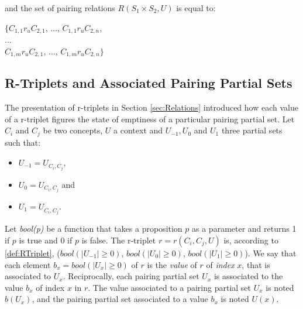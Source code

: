 and the set of pairing relations $R(S_{1} \times S_{2}, U)$ is equal to:

\begin{center}
    $\{ C_{1,1} r_{u} C_{2,1}$, $\ldots$, $C_{1,1} r_{u} C_{2,n}$,\\
    $\ldots$\\
    $C_{1,m} r_{u} C_{2,1}$, $\ldots$, $C_{1,m} r_{u} C_{2,n} \}$
\end{center}

\subsection{R-Triplets and Associated Pairing Partial Sets}

The presentation of r-triplets in Section \ref{sec:Relations} introduced how each value of a r-triplet figures the state of emptiness of a particular pairing partial set. Let $C_{i}$ and $C_{j}$ be two concepts, $U$ a context and $U_{-1}, U_{0}$ and $U_{1}$ three partial sets such that:

\begin{itemize}
    \item $U_{-1} = U_{C_{i},\overbar{C_{j}}}$,
    \item $U_{0} = U_{C_{i},C_{j}}$ and 
    \item $U_{1} = U_{\overbar{C_{i}},C_{j}}$.
\end{itemize}

Let \emph{bool(p)} be a function that takes a proposition $p$ as a parameter and returns 1 if $p$ is true and 0 if $p$ is false. The r-triplet $r = r(C_{i}, C_{j}, U)$ is, according to \ref{def:RTriplet}, ($bool(|U_{-1}| \geq 0)$, $bool(|U_{0}| \geq 0)$, $bool(|U_{1}| \geq 0)$). We say that each element $b_{x} = bool(|U_{x}| \geq 0)$ of $r$ is the \emph{value} of $r$ of \emph{index} $x$, that is associated to $U_{x}$. Reciprocally, each pairing partial set $U_{x}$ is associated to the value $b_{x}$ of index $x$ in $r$. The value associated to a pairing partial set $U_{x}$ is noted $b(U_{x})$, and the pairing partial set associated to a value $b_{x}$ is noted $U(x)$.
